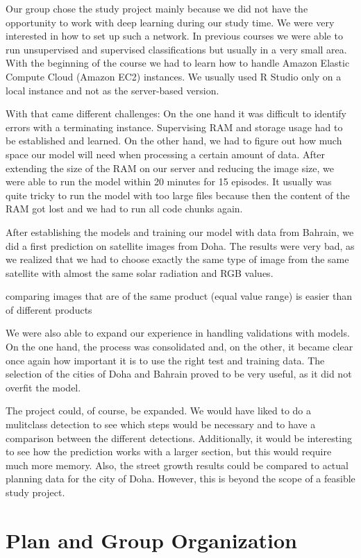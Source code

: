 \documentclass[
]{article}
\begin{document}
Our group chose the study project mainly because we did not have the
opportunity to work with deep learning during our study time. We were
very interested in how to set up such a network. In previous courses we
were able to run unsupervised and supervised classifications but usually
in a very small area. With the beginning of the course we had to learn
how to handle Amazon Elastic Compute Cloud (Amazon EC2) instances. We
usually used R Studio only on a local instance and not as the
server-based version.

With that came different challenges: On the one hand it was difficult to
identify errors with a terminating instance. Supervising RAM and storage
usage had to be established and learned. On the other hand, we had to
figure out how much space our model will need when processing a certain
amount of data. After extending the size of the RAM on our server and
reducing the image size, we were able to run the model within 20 minutes
for 15 episodes. It usually was quite tricky to run the model with too
large files because then the content of the RAM got lost and we had to
run all code chunks again.

After establishing the models and training our model with data from
Bahrain, we did a first prediction on satellite images from Doha. The
results were very bad, as we realized that we had to choose exactly the
same type of image from the same satellite with almost the same solar
radiation and RGB values.

comparing images that are of the same product (equal value range) is
easier than of different products

We were also able to expand our experience in handling validations with
models. On the one hand, the process was consolidated and, on the other,
it became clear once again how important it is to use the right test and
training data. The selection of the cities of Doha and Bahrain proved to
be very useful, as it did not overfit the model.

The project could, of course, be expanded. We would have liked to do a
mulitclass detection to see which steps would be necessary and to have a
comparison between the different detections. Additionally, it would be
interesting to see how the prediction works with a larger section, but
this would require much more memory. Also, the street growth results
could be compared to actual planning data for the city of Doha. However,
this is beyond the scope of a feasible study project.

\hypertarget{plan-and-group-organization}{%
\section{Plan and Group
Organization}\label{plan-and-group-organization}}
\end{document}
